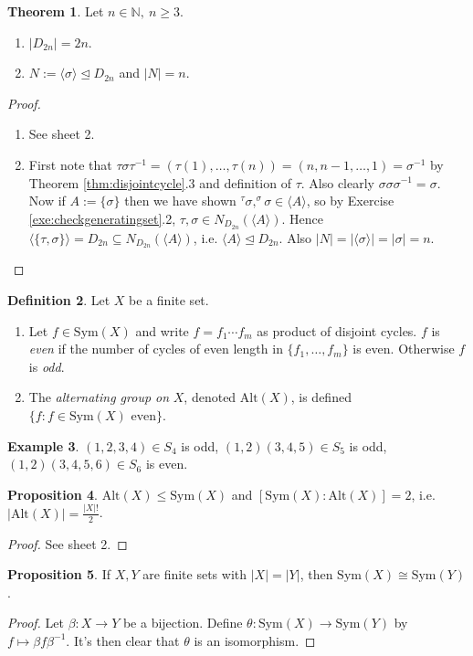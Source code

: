 \documentclass[a4paper]{article}
\newcommand{\Sym}{\text{Sym}}
\newcommand{\Alt}{\text{Alt}}
\theoremstyle{definition}
\newtheorem{defn}{Definition}[subsection]
\newtheorem{prop}[defn]{Proposition}
\newtheorem{thm}[defn]{Theorem}
\newtheorem{example}[defn]{Example}
\begin{document}
\begin{thm}
Let $n\in\mathbb N,\ n\geq 3$.
\begin{enumerate}
\item $|D_{2n}|=2n$.
\item $N:=\langle\sigma\rangle \unlhd D_{2n}$ and $|N|=n$.
\end{enumerate}
\end{thm}
\begin{proof}
\begin{enumerate}
\item See sheet 2.
\item First note that $\tau\sigma\tau^{-1}=(\tau(1),\ldots,\tau(n))=(n,n-1,\ldots,1)=\sigma^{-1}$ by Theorem \ref{thm:disjointcycle}.3 and definition of $\tau$. Also clearly $\sigma\sigma\sigma^{-1}=\sigma$. Now if $A:=\{\sigma\}$ then we have shown $^\tau \sigma,^\sigma \sigma \in\langle A\rangle$, so by Exercise \ref{exe:checkgeneratingset}.2, $\tau,\sigma\in N_{D_{2n}}(\langle A\rangle)$. Hence $\langle\{\tau,\sigma\}\rangle=D_{2n}\subseteq N_{D_{2n}}(\langle A\rangle)$, i.e. $\langle A\rangle \unlhd D_{2n}$. Also $|N|=|\langle \sigma\rangle|=|\sigma|=n$.
\end{enumerate}
\end{proof}

\begin{defn}
Let $X$ be a finite set.
\begin{enumerate}
\item Let $f\in\Sym(X)$ and write $f=f_1\cdots f_m$ as product of disjoint cycles. $f$ is \textit{even} if the number of cycles of even length in $\{f_1,\ldots,f_m\}$ is even. Otherwise $f$ is \textit{odd}.
\item The \textit{alternating group on} $X$, denoted $\Alt(X)$, is defined $\{f:f\in\Sym(X)\text{ even}\}$.
\end{enumerate}
\end{defn}
\begin{example}
$(1,2,3,4)\in S_4$ is odd, $(1,2)(3,4,5)\in S_5$ is odd, $(1,2)(3,4,5,6)\in S_6$ is even.
\end{example}

\begin{prop}
$\Alt(X)\leq \Sym(X)$ and $[\Sym(X):\Alt(X)]=2$, i.e. $|\Alt(X)|=\frac{|X|!}{2}$.
\end{prop}
\begin{proof}
See sheet 2.
\end{proof}

\begin{prop}
If $X,Y$ are finite sets with $|X|=|Y|$, then $\Sym(X)\cong\Sym(Y)$.
\end{prop}
\begin{proof}
Let $\beta:X\rightarrow Y$ be a bijection. Define $\theta:\Sym(X)\rightarrow\Sym(Y)$ by $f\mapsto \beta f\beta^{-1}$. It's then clear that $\theta$ is an isomorphism.
\end{proof}
\end{document}
